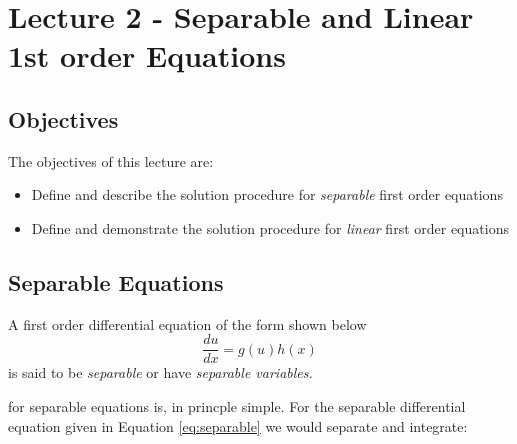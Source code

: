 \chapter{Lecture 2 - Separable and Linear 1st order Equations}
\label{ch:lec2}
\section{Objectives}
The objectives of this lecture are:
\begin{itemize}
\item Define and describe the solution procedure for \emph{separable} first order equations
\item Define and demonstrate the solution procedure for \emph{linear} first order equations
\end{itemize}

\section{Separable Equations}
A first order differential equation of the form shown below
\begin{equation}
\frac{du}{dx} = g(u)h(x)
\label{eq:separable}
\end{equation}
is said to be \emph{separable} or have \emph{separable variables.} 

 for separable equations is, in princple simple.  For the separable differential equation given in Equation \ref{eq:separable} we would separate and integrate:

